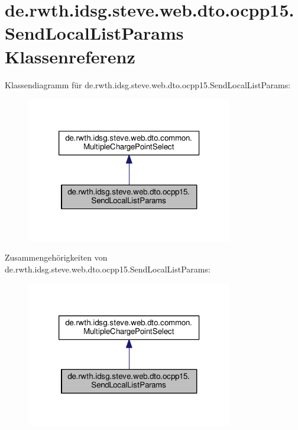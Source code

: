 \hypertarget{classde_1_1rwth_1_1idsg_1_1steve_1_1web_1_1dto_1_1ocpp15_1_1_send_local_list_params}{\section{de.\-rwth.\-idsg.\-steve.\-web.\-dto.\-ocpp15.\-Send\-Local\-List\-Params Klassenreferenz}
\label{classde_1_1rwth_1_1idsg_1_1steve_1_1web_1_1dto_1_1ocpp15_1_1_send_local_list_params}
}


Klassendiagramm für de.\-rwth.\-idsg.\-steve.\-web.\-dto.\-ocpp15.\-Send\-Local\-List\-Params\-:
\nopagebreak
\begin{figure}[H]
\begin{center}
\leavevmode
\includegraphics[width=256pt]{classde_1_1rwth_1_1idsg_1_1steve_1_1web_1_1dto_1_1ocpp15_1_1_send_local_list_params__inherit__graph}
\end{center}
\end{figure}


Zusammengehörigkeiten von de.\-rwth.\-idsg.\-steve.\-web.\-dto.\-ocpp15.\-Send\-Local\-List\-Params\-:
\nopagebreak
\begin{figure}[H]
\begin{center}
\leavevmode
\includegraphics[width=256pt]{classde_1_1rwth_1_1idsg_1_1steve_1_1web_1_1dto_1_1ocpp15_1_1_send_local_list_params__coll__graph}
\end{center}
\end{figure}
